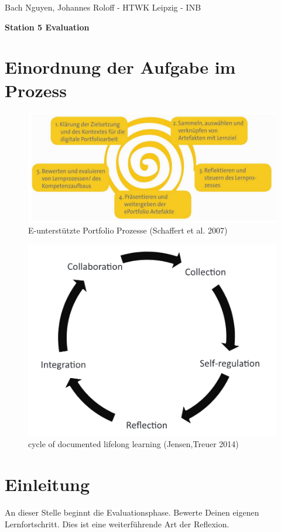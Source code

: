 \documentclass[a4paper,oneside]{scrarticle}
\begin{document}
	\begin{flushleft}
		Bach Nguyen, Johannes Roloff - HTWK Leipzig - INB
	\end{flushleft}
	\begin{center}
		\begin{LARGE}
			\textbf{Station 5 Evaluation}
		\end{LARGE}
	\end{center}
	\section*{Einordnung der Aufgabe im Prozess}
	\begin{figure} [h]
		\centering
		\includegraphics[width=0.7\linewidth]{e-portfolio-prozesse-schaffert}
		\caption{E-unterstützte Portfolio Prozesse (Schaffert et al. 2007)}
		\label{fig:e-portfolio-prozesse-schaffert}
	\end{figure}
	\begin{figure}[h]
		\centering
		\includegraphics[width=0.7\linewidth]{cycle-of-documented-lifelong-learning-Jensen}
		\caption{cycle of documented lifelong learning (Jensen,Treuer 2014)}
		\label{fig:cycle-of-documented-lifelong-learning-jensen}
	\end{figure}
	\pagebreak 
	
	\section*{Einleitung}
	An dieser Stelle beginnt die Evaluationsphase. Bewerte Deinen eigenen Lernfortschritt. Dies ist eine weiterführende Art der Reflexion. 
	
\end{document}
